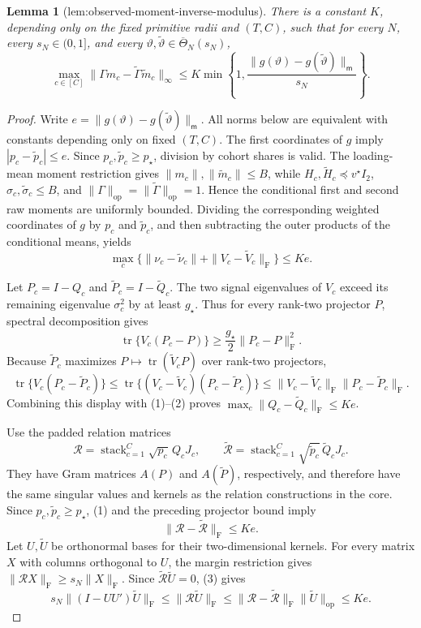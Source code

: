 \documentclass{article}
\newtheorem{lemma}{Lemma}
\begin{document}
\begin{lemma}[lem:observed-moment-inverse-modulus]\label{lem:observed-moment-inverse-modulus}
There is a constant \(K\), depending only on the fixed primitive radii and \((T,C)\), such that for every \(N\), every \(s_N\in(0,1]\), and every \(\vartheta,\widetilde\vartheta\in\overline\Theta_N(s_N)\),
\[
\max_{c\in[C]}\|\Gamma m_c-\widetilde\Gamma\widetilde m_c\|_\infty
\leq K\min\!\left\{1,\frac{\|g(\vartheta)-g(\widetilde\vartheta)\|_{\mathsf m}}{s_N}\right\}.
\]
\end{lemma}
\begin{proof}
Write \(e=\|g(\vartheta)-g(\widetilde\vartheta)\|_{\mathsf m}\). All norms below are equivalent with constants depending only on fixed \((T,C)\). The first coordinates of \(g\) imply \(|p_c-\widetilde p_c|\leq e\). Since \(p_c,\widetilde p_c\geq p_\star\), division by cohort shares is valid. The loading-mean moment restriction gives \(\|m_c\|,\|\widetilde m_c\|\leq B\), while \(H_c,\widetilde H_c\preceq v^\star I_2\), \(\sigma_c,\widetilde\sigma_c\leq B\), and \(\|\Gamma\|_{\mathrm{op}}=\|\widetilde\Gamma\|_{\mathrm{op}}=1\). Hence the conditional first and second raw moments are uniformly bounded. Dividing the corresponding weighted coordinates of \(g\) by \(p_c\) and \(\widetilde p_c\), and then subtracting the outer products of the conditional means, yields
\[
\max_c\{\|\nu_c-\widetilde\nu_c\|+\|V_c-\widetilde V_c\|_{\mathrm F}\}\leq K e. \tag{1}
\]

Let \(P_c=I-Q_c\) and \(\widetilde P_c=I-\widetilde Q_c\). The two signal eigenvalues of \(V_c\) exceed its remaining eigenvalue \(\sigma_c^2\) by at least \(g_\star\). Thus for every rank-two projector \(P\), spectral decomposition gives
\[
\operatorname{tr}\{V_c(P_c-P)\}\geq \frac{g_\star}{2}\|P_c-P\|_{\mathrm F}^2. \tag{2}
\]
Because \(\widetilde P_c\) maximizes \(P\mapsto\operatorname{tr}(\widetilde V_cP)\) over rank-two projectors,
\[
\operatorname{tr}\{V_c(P_c-\widetilde P_c)\}
\leq \operatorname{tr}\{(V_c-\widetilde V_c)(P_c-\widetilde P_c)\}
\leq \|V_c-\widetilde V_c\|_{\mathrm F}\|P_c-\widetilde P_c\|_{\mathrm F}.
\]
Combining this display with (1)--(2) proves \(\max_c\|Q_c-\widetilde Q_c\|_{\mathrm F}\leq Ke\).

Use the padded relation matrices
\[
\mathcal R=\operatorname{stack}_{c=1}^C\sqrt{p_c}\,Q_cJ_c,
\qquad
\widetilde{\mathcal R}=\operatorname{stack}_{c=1}^C\sqrt{\widetilde p_c}\,\widetilde Q_cJ_c.
\]
They have Gram matrices \(A(P)\) and \(A(\widetilde P)\), respectively, and therefore have the same singular values and kernels as the relation constructions in the core. Since \(p_c,\widetilde p_c\geq p_\star\), (1) and the preceding projector bound imply
\[
\|\mathcal R-\widetilde{\mathcal R}\|_{\mathrm F}\leq Ke. \tag{3}
\]
Let \(U,\widetilde U\) be orthonormal bases for their two-dimensional kernels. For every matrix \(X\) with columns orthogonal to \(U\), the margin restriction gives \(\|\mathcal RX\|_{\mathrm F}\geq s_N\|X\|_{\mathrm F}\). Since \(\widetilde{\mathcal R}\widetilde U=0\), (3) gives
\[
s_N\|(I-UU')\widetilde U\|_{\mathrm F}
\leq \|\mathcal R\widetilde U\|_{\mathrm F}
\leq \|\mathcal R-\widetilde{\mathcal R}\|_{\mathrm F}\|\widetilde U\|_{\mathrm{op}}
\leq Ke. \tag{4}
\]


\end{proof}
\end{document}
